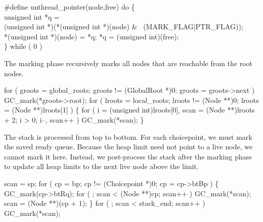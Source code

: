 \nwenddocs{}\plusendmoddef\nwstartdeflinemarkup{}\nwenddeflinemarkup
#define unthread_pointer(node,free) do \{ \\
    unsigned int *q = \\
        (unsigned int *)(*(unsigned int *)(node) & ~(MARK_FLAG|PTR_FLAG)); \\
    *(unsigned int *)(node) = *q; *q = (unsigned int)(free); \\
\} while ( 0 )

\nwendcode{}\nwdocspar
The marking phase recursively marks all nodes that are reachable from
the root nodes.

\nwenddocs{}\endmoddef\nwstartdeflinemarkup{}\nwenddeflinemarkup
for ( groots = global_roots; groots != (GlobalRoot *)0; groots = groots->next )
    GC_mark(*groots->root);
for ( lroots = local_roots; lroots != (Node **)0; lroots = (Node **)lroots[1] )
\{
    for ( i = (unsigned int)lroots[0], scan = (Node **)lroots + 2;
          i > 0;
          i--, scan++ )
        GC_mark(*scan);
\}

\nwendcode{}\nwdocspar
The stack is processed from top to bottom. For each choicepoint, we
must mark the saved ready queue. Because the heap limit need not point
to a live node, we cannot mark it here. Instead, we post-process the
stack after the marking phase to update all heap limits to the next
live node above the limit.

\nwenddocs{}\plusendmoddef\nwstartdeflinemarkup{}\nwenddeflinemarkup
scan = sp;
for ( cp = bp; cp != (Choicepoint *)0; cp = cp->btBp )
\{
    GC_mark(cp->btRq);
    for ( ; scan < (Node **)cp; scan++ )
        GC_mark(*scan);
    scan = (Node **)(cp + 1);
\}
for ( ; scan < stack_end; scan++ )
    GC_mark(*scan);

